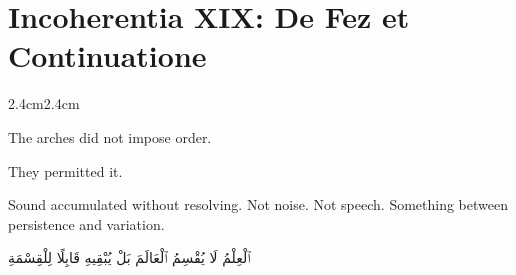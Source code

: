 
\chapter*{Incoherentia XIX: De Fez et Continuatione}

\pagestyle{incoherence}

\vspace{2em}

\begin{adjustwidth}{2.4cm}{2.4cm}

The arches did not impose order.

\medskip

They permitted it.

\vspace{2em}

Sound accumulated without resolving. Not noise. Not speech. Something between
persistence and variation.

\vspace{3em}

\end{adjustwidth}

\begin{center}
\begin{AR}
ٱلْعِلْمُ لَا يُقْسِمُ ٱلْعَالَمَ بَلْ يُبْقِيهِ قَابِلًا لِلْقِسْمَةِ
\end{AR}
\end{center}

\vspace{3em}

